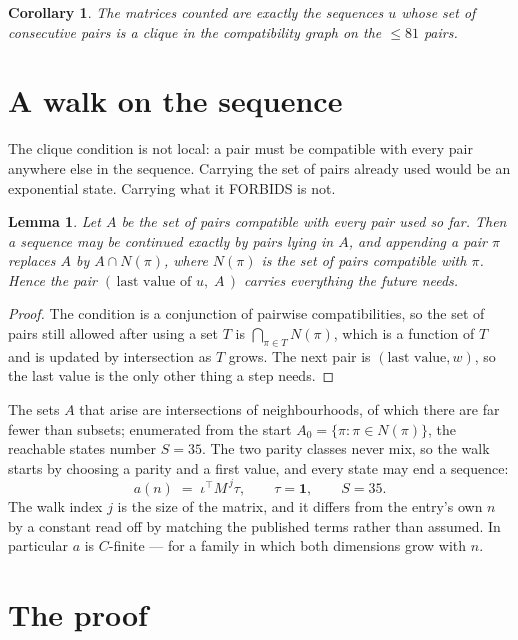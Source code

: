 \documentclass[11pt,a4paper]{article}
\theoremstyle{plain}
\newtheorem{lemma}[theorem]{Lemma}
\newtheorem{corollary}[theorem]{Corollary}
\theoremstyle{definition}
\begin{document}
\begin{corollary}
The matrices counted are exactly the sequences $u$ whose set of consecutive pairs is a clique in
the compatibility graph on the $\le 81$ pairs.
\end{corollary}

\section{A walk on the sequence}

The clique condition is not local: a pair must be compatible with every pair anywhere else in
the sequence. Carrying the set of pairs already used would be an exponential state. Carrying
what it FORBIDS is not.

\begin{lemma}\label{lem:lump}
Let $A$ be the set of pairs compatible with every pair used so far. Then a sequence may be
continued exactly by pairs lying in $A$, and appending a pair $\pi$ replaces $A$ by
$A\cap N(\pi)$, where $N(\pi)$ is the set of pairs compatible with $\pi$. Hence the pair
$(\,\text{last value of }u,\;A\,)$ carries everything the future needs.
\end{lemma}

\begin{proof}
The condition is a conjunction of pairwise compatibilities, so the set of pairs still allowed
after using a set $T$ is $\bigcap_{\pi\in T}N(\pi)$, which is a function of $T$ and is updated
by intersection as $T$ grows. The next pair is $(\text{last value},w)$, so the last value is
the only other thing a step needs.
\end{proof}

The sets $A$ that arise are intersections of neighbourhoods, of which there are far fewer than
subsets; enumerated from the start $A_0=\{\pi:\pi\in N(\pi)\}$, the reachable states number
$S=35$. The two parity classes never mix, so the walk starts by choosing a parity and a first
value, and every state may end a sequence:
\[
a(n)\;=\;\iota^{\!\top}M^{\,j}\tau ,\qquad \tau=\mathbf{1},\qquad S=35.
\]
The walk index $j$ is the size of the matrix, and it differs from the entry's own $n$ by a
constant read off by matching the published terms rather than assumed. In particular $a$ is
$C$-finite --- for a family in which both dimensions grow with $n$.

\section{The proof}
\end{document}
